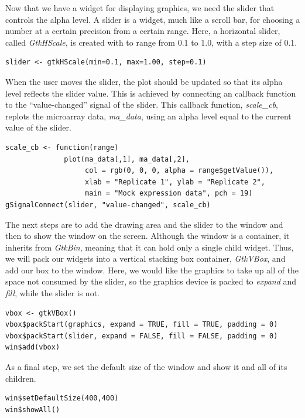 \documentclass[article]{jss}
\begin{document}
Now that we have a widget for displaying  graphics, we
need the slider that controls the alpha level. A slider is a widget,
much like a scroll bar, for choosing a number at a certain precision
from a certain range. Here, a horizontal slider, called
\emph{GtkHScale}, is created with to range from 0.1 to 1.0, with a
step size of 0.1.
\begin{verbatim}
slider <- gtkHScale(min=0.1, max=1.00, step=0.1)
\end{verbatim}

When the user moves the slider, the plot should be updated so that its alpha
level reflects the slider value. This is achieved by connecting
an  callback function to the ``value-changed'' signal of the slider. 
This callback function, \emph{scale\_cb}, replots the microarray data, \emph{ma\_data}, using
an alpha level equal to the current value of the slider. 
\begin{verbatim}
scale_cb <- function(range) 
              plot(ma_data[,1], ma_data[,2], 
                   col = rgb(0, 0, 0, alpha = range$getValue()),
                   xlab = "Replicate 1", ylab = "Replicate 2", 
                   main = "Mock expression data", pch = 19)
gSignalConnect(slider, "value-changed", scale_cb)
\end{verbatim}

The next steps are to add the drawing area and the slider to the
window and then to show the window on the screen. Although the window is a
container, it inherits from \emph{GtkBin}, meaning that it can hold only
a single child widget. Thus, we will pack our widgets into a vertical stacking 
box container, \emph{GtkVBox}, and add our box to the window.
Here, we would like the graphics to take up all of the space not consumed by the
slider, so the graphics device is packed to \emph{expand} and \emph{fill}, while
the slider is not.
\begin{verbatim}
vbox <- gtkVBox()
vbox$packStart(graphics, expand = TRUE, fill = TRUE, padding = 0)
vbox$packStart(slider, expand = FALSE, fill = FALSE, padding = 0)
win$add(vbox)
\end{verbatim}

As a final step, we set the default size of the window and show it and
all of its children.
\begin{verbatim}
win$setDefaultSize(400,400)
win$showAll() 
\end{verbatim}
\end{document}
